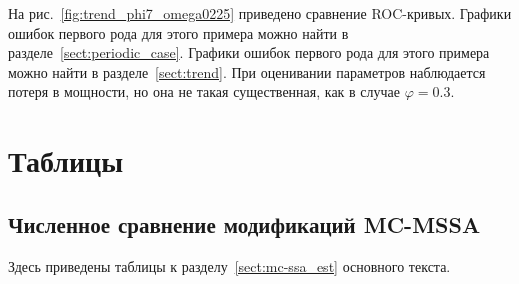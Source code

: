 \documentclass[specialist,
substylefile = spbu.rtx,
               subf,href,colorlinks=true, 12pt]{disser}
\theoremstyle{definition}
\begin{document}
На рис.~\ref{fig:trend_phi7_omega0225} приведено сравнение ROC-кривых. Графики ошибок первого рода для этого примера можно найти в разделе~\ref{sect:periodic_case}. Графики ошибок первого рода для этого примера можно найти в разделе~\ref{sect:trend}. При оценивании параметров наблюдается потеря в мощности, но она не такая существенная, как в случае $\varphi=0.3$.

\chapter{Таблицы}
\section{Численное сравнение модификаций MC-MSSA}\label{appendix:mc-mssa_tables}
Здесь приведены таблицы к разделу~\ref{sect:mc-ssa_est} основного текста.
\end{document}
